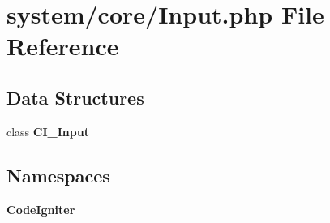 \section{system/core/\-Input.php File Reference}
\label{_input_8php}
\subsection*{Data Structures}
\begin{DoxyCompactItemize}
\item 
class {\bf C\-I\-\_\-\-Input}
\end{DoxyCompactItemize}
\subsection*{Namespaces}
\begin{DoxyCompactItemize}
\item 
{\bf Code\-Igniter}
\end{DoxyCompactItemize}

